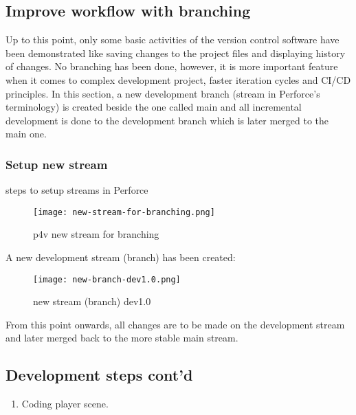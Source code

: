 \subsection{Improve workflow with branching}
Up to this point, only some basic activities of the version control software have been
demonstrated like saving changes to the project files and displaying history of changes. No branching
has been done, however, it is more important feature when it comes to complex development project, faster iteration cycles and
CI/CD principles. In this section, a new development branch (stream in Perforce's terminology) is created beside the one
called main and all incremental development is done to the development branch which is later merged to the main one.
\subsubsection{Setup new stream}
steps to setup streams in Perforce
\begin{figure}[H]
    \centering
    \texttt{[image: new-stream-for-branching.png]}
      \caption{p4v new stream for branching}
      \label{fig:new-stream-for-branching}
\end{figure}
A new development stream (branch) has been created:
\begin{figure}[H]
    \centering
    \texttt{[image: new-branch-dev1.0.png]}
      \caption{new stream (branch) dev1.0}
      \label{fig:new-branch-dev1.0}
\end{figure}
From this point onwards, all changes are to be made on the development stream and later merged back to the more stable
main stream.

\subsection{Development steps cont'd}
\begin{enumerate}[resume]
    \item Coding player scene.
\end{enumerate}